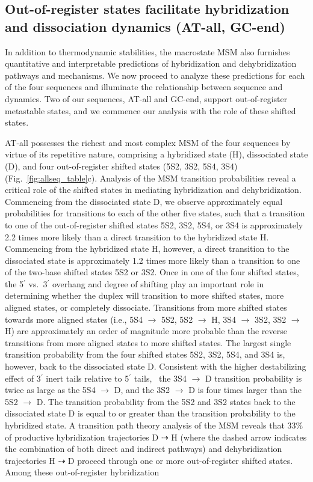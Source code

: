 \documentclass[journal=jpcbfk,manuscript=article]{achemso}
\begin{document}
\subsection{Out-of-register states facilitate hybridization and dissociation dynamics (AT-all, GC-end)}

In addition to thermodynamic stabilities, the macrostate MSM also furnishes quantitative and interpretable predictions of hybridization and dehybridization pathways and mechanisms. We now proceed to analyze these predictions for each of the four sequences and illuminate the relationship between sequence and dynamics. Two of our sequences, AT-all and GC-end, support out-of-register metastable states, and we commence our analysis with the role of these shifted states.

AT-all possesses the richest and most complex MSM of the four sequences by virtue of its repetitive nature, comprising a hybridized state (H), dissociated state (D), and four out-of-register shifted states (5S2, 3S2, 5S4, 3S4) (Fig.~\ref{fig:allseq_table}c). Analysis of the MSM transition probabilities reveal a critical role of the shifted states in mediating hybridization and dehybridization. Commencing from the dissociated state D, we observe approximately equal probabilities for transitions to each of the other five states, such that a transition to one of the out-of-register shifted states 5S2, 3S2, 5S4, or 3S4 is approximately 2.2 times more likely than a direct transition to the hybridized state H. Commencing from the hybridized state H, however, a direct transition to the dissociated state is approximately 1.2 times more likely than a transition to one of the two-base shifted states 5S2 or 3S2. Once in one of the four shifted states, the 5$^\prime$ vs.\ 3$^\prime$ overhang and degree of shifting play an important role in determining whether the duplex will transition to more shifted states, more aligned states, or completely dissociate. Transitions from more shifted states towards more aligned states (i.e., 5S4 $\rightarrow$ 5S2, 5S2 $\rightarrow$ H, 3S4 $\rightarrow$ 3S2, 3S2 $\rightarrow$ H) are approximately an order of magnitude more probable than the reverse transitions from more aligned states to more shifted states. The largest single transition probability from the four shifted states 5S2, 3S2, 5S4, and 3S4 is, however, back to the dissociated state D. Consistent with the higher destabilizing effect of 3$^\prime$ inert tails relative to 5$^\prime$ tails,~\citep{Doktycz1990ThermodynamicC, Dickman2012ThermodynamicDNAs, DiMichele2014EffectHybridization} the 3S4 $\rightarrow$ D transition probability is twice as large as the 5S4 $\rightarrow$ D, and the 3S2 $\rightarrow$ D is four times larger than the 5S2 $\rightarrow$ D. The transition probability from the 5S2 and 3S2 states back to the dissociated state D is equal to or greater than the transition probability to the hybridized state. A transition path theory analysis of the MSM reveals that 33\% of productive hybridization trajectories D $\dashrightarrow$ H (where the dashed arrow indicates the combination of both direct and indirect pathways) and dehybridization trajectories H $\dashrightarrow$ D proceed through one or more out-of-register shifted states. Among these out-of-register hybridization 
\end{document}
